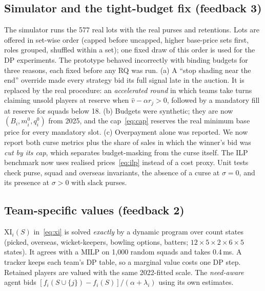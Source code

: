 \documentclass{article}
\newcommand{\1}{\mathbb{1}}
\begin{document}
\subsection{Simulator and the tight-budget fix (feedback 3)}\label{sec:m-sim}
The simulator runs the 577 real lots with the real purses and retentions. Lots are offered in set-wise order (capped before uncapped, higher base-price sets first, roles grouped, shuffled within a set); one fixed draw of this order is used for the DP experiments. The prototype behaved incorrectly with binding budgets for three reasons, each fixed before any RQ was run. (a) A ``stop shading near the end'' override made every strategy bid its full signal late in the auction. It is replaced by the real procedure: an \emph{accelerated round} in which teams take turns claiming unsold players at reserve when $\hat v-\alpha r_j>0$, followed by a mandatory fill at reserve for squads below 18. (b) Budgets were synthetic; they are now $(B_i,m^0_i,q^0_i)$ from 2025, and the cap~\eqref{eq:cap} reserves the real minimum base price for every mandatory slot. (c) Overpayment alone was reported. We now report both curse metrics plus the share of sales in which the winner's bid was \emph{cut by its cap}, which separates budget-masking from the curse itself. The ILP benchmark now uses realised prices~\eqref{eq:ilp} instead of a cost proxy. Unit tests check purse, squad and overseas invariants, the absence of a curse at $\sigma=0$, and its presence at $\sigma>0$ with slack purses.

\subsection{Team-specific values (feedback 2)}\label{sec:m-xi}
$\mathrm{XI}_i(S)$ in~\eqref{eq:xi} is solved \emph{exactly} by a dynamic program over count states (picked, overseas, wicket-keepers, bowling options, batters; $12\times5\times2\times6\times5$ states). It agrees with a MILP on 1{,}000 random squads and takes 0.4\,ms. A tracker keeps each team's DP table, so a marginal value costs one DP step. Retained players are valued with the same 2022-fitted scale. The \emph{need-aware} agent bids $[f_i(S\cup\{j\})-f_i(S)]/(\alpha+\lambda_i)$ using its own estimates.
\end{document}
